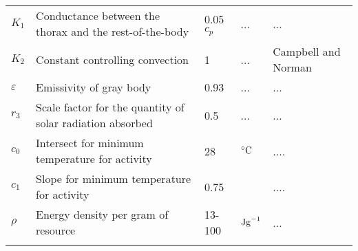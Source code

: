 \begin{sidewaystable}
\begin{tabular}{l l l l l}
$K_1$& Conductance between the thorax and the rest-of-the-body & 0.05 $c_p$ & ... & ... \\
$K_2$& Constant controlling convection & 1   & ... & Campbell and Norman \\
$\varepsilon$& Emissivity of gray body & 0.93& ...& ... \\
$r_3$  & Scale factor for the quantity of solar radiation absorbed & 0.5 & ... & ... \\
$c_0$ & Intersect for minimum temperature for activity & 28 & $^{\circ}\rm{C}$  & ....\\
$c_1$ & Slope for minimum temperature for activity & 0.75 &  & ....\\
$\rho$ &Energy density per gram of resource & 13-100 &  $\rm{J g}^{-1}$  & ... \\  %
\hline
\label{table:1}
\end{tabular}
\end{sidewaystable}

